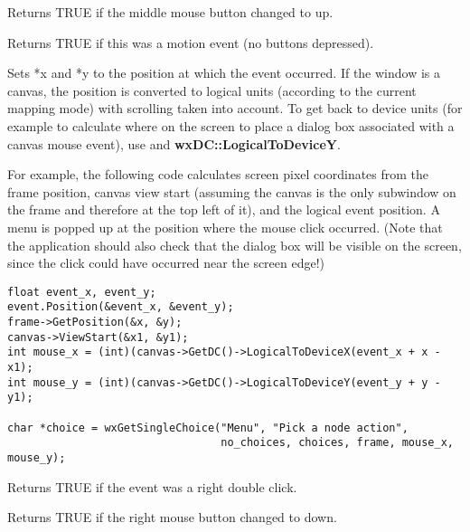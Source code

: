 
Returns TRUE if the middle mouse button changed to up.



Returns TRUE if this was a motion event (no buttons depressed).



Sets *x and *y to the position at which the event occurred. If the
window is a canvas, the position is converted to logical units
(according to the current mapping mode) with scrolling taken into
account. To get back to device units (for example to calculate where on the
screen to place a dialog box associated with a canvas mouse event), use
 and {\bf wxDC::LogicalToDeviceY}.

For example, the following code calculates screen pixel coordinates
from the frame position, canvas view start (assuming the canvas is the only
subwindow on the frame and therefore at the top left of it), and the
logical event position. A menu is popped up at the position where the
mouse click occurred. (Note that the application should also check that
the dialog box will be visible on the screen, since the click could have
occurred near the screen edge!)

\begin{verbatim}
float event_x, event_y;
event.Position(&event_x, &event_y);
frame->GetPosition(&x, &y);
canvas->ViewStart(&x1, &y1);
int mouse_x = (int)(canvas->GetDC()->LogicalToDeviceX(event_x + x - x1);
int mouse_y = (int)(canvas->GetDC()->LogicalToDeviceY(event_y + y - y1);

char *choice = wxGetSingleChoice("Menu", "Pick a node action",
                                 no_choices, choices, frame, mouse_x, mouse_y);
\end{verbatim}



Returns TRUE if the event was a right double click.



Returns TRUE if the right mouse button changed to down.


